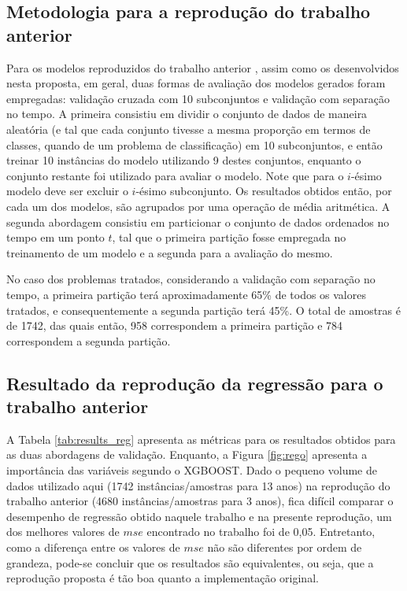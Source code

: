 \subsection{Metodologia para a reprodução do trabalho anterior}

Para os modelos reproduzidos do trabalho anterior \cite{REZENDE:2009}, assim como os desenvolvidos nesta proposta, em geral, duas formas de avaliação dos modelos gerados foram empregadas: validação cruzada com 10 subconjuntos e validação com separação no tempo. A primeira consistiu em dividir o conjunto de dados de maneira aleatória (e tal que cada conjunto tivesse a mesma proporção em termos de classes, quando de um problema de classificação) em 10 subconjuntos, e então treinar 10 instâncias do modelo utilizando 9 destes conjuntos, enquanto o conjunto restante foi utilizado para avaliar o modelo. Note que para o $i$-ésimo modelo deve ser excluir o $i$-ésimo subconjunto. Os resultados obtidos então, por cada um dos modelos, são agrupados por uma operação de média aritmética. A segunda abordagem consistiu em particionar o conjunto de dados ordenados no tempo em um ponto $t$, tal que o primeira partição fosse empregada no treinamento de um modelo e a segunda para a avaliação do mesmo.

No caso dos problemas tratados, considerando a validação com separação no tempo, a primeira partição terá aproximadamente 65\% de todos os valores tratados, e consequentemente a segunda partição terá 45\%. O total de amostras é de 1742, das quais então, 958 correspondem a primeira partição e 784 correspondem a segunda partição.


\subsection{Resultado da reprodução da regressão para o trabalho anterior}

A Tabela \ref{tab:results_reg} apresenta as métricas para os resultados obtidos para as duas abordagens de validação. Enquanto, a Figura \ref{fig:rego} apresenta a importância das variáveis segundo o XGBOOST. Dado o pequeno volume de dados utilizado aqui (1742 instâncias/amostras para 13 anos) na reprodução do trabalho anterior (4680 instâncias/amostras para 3 anos), fica difícil comparar o desempenho de regressão obtido naquele trabalho e na presente reprodução, um dos melhores valores de $mse$ encontrado no trabalho \cite{REZENDE:2009} foi de 0,05. Entretanto, como a diferença entre os valores de $mse$ não são diferentes por ordem de grandeza, pode-se concluir que os resultados são equivalentes, ou seja, que a reprodução proposta é tão boa quanto a implementação original.


